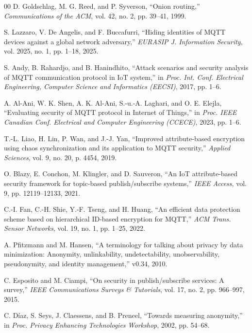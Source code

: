 \documentclass[conference]{IEEEtran}
\begin{document}
\begin{thebibliography}{00}
D. Goldschlag, M. G. Reed, and P. Syverson, ``Onion routing,'' \textit{Communications of the ACM}, vol. 42, no. 2, pp. 39--41, 1999.

S. Lazzaro, V. De Angelis, and F. Buccafurri, ``Hiding identities of MQTT devices against a global network adversary,'' \textit{EURASIP J. Information Security}, vol. 2025, no. 1, pp. 1--18, 2025.

S. Andy, B. Rahardjo, and B. Hanindhito, ``Attack scenarios and security analysis of MQTT communication protocol in IoT system,'' in \textit{Proc. Int. Conf. Electrical Engineering, Computer Science and Informatics (EECSI)}, 2017, pp. 1--6.

A. Al-Ani, W. K. Shen, A. K. Al-Ani, S.-u.-A. Laghari, and O. E. Elejla, ``Evaluating security of MQTT protocol in Internet of Things,'' in \textit{Proc. IEEE Canadian Conf. Electrical and Computer Engineering (CCECE)}, 2023, pp. 1--6.

T.-L. Liao, H. Lin, P. Wan, and J.-J. Yan, ``Improved attribute-based encryption using chaos synchronization and its application to MQTT security,'' \textit{Applied Sciences}, vol. 9, no. 20, p. 4454, 2019.

O. Blazy, E. Conchon, M. Klingler, and D. Sauveron, ``An IoT attribute-based security framework for topic-based publish/subscribe systems,'' \textit{IEEE Access}, vol. 9, pp. 12119--12133, 2021.

C.-I. Fan, C.-H. Shie, Y.-F. Tseng, and H. Huang, ``An efficient data protection scheme based on hierarchical ID-based encryption for MQTT,'' \textit{ACM Trans. Sensor Networks}, vol. 19, no. 1, pp. 1--25, 2022.

A. Pfitzmann and M. Hansen, ``A terminology for talking about privacy by data minimization: Anonymity, unlinkability, undetectability, unobservability, pseudonymity, and identity management,'' v0.34, 2010.

C. Esposito and M. Ciampi, ``On security in publish/subscribe services: A survey,'' \textit{IEEE Communications Surveys \& Tutorials}, vol. 17, no. 2, pp. 966--997, 2015.

C. D\'{i}az, S. Seys, J. Claessens, and B. Preneel, ``Towards measuring anonymity,'' in \textit{Proc. Privacy Enhancing Technologies Workshop}, 2002, pp. 54--68.


\end{thebibliography}
\end{document}

